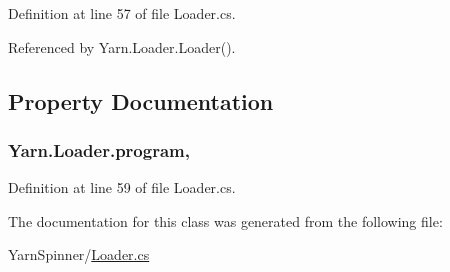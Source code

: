 Definition at line 57 of file Loader.\-cs.



Referenced by Yarn.\-Loader.\-Loader().



\subsection{Property Documentation}
\hypertarget{a00135_a6d8296076823c0c082df9024367f4860}{
\subsubsection[{program}]{ Yarn.\-Loader.\-program\hspace{0.3cm}{\ttfamily [get]}, {\ttfamily [set]}}}\label{a00135_a6d8296076823c0c082df9024367f4860}


Definition at line 59 of file Loader.\-cs.



The documentation for this class was generated from the following file\-:\begin{DoxyCompactItemize}
\item 
Yarn\-Spinner/\hyperlink{a00315}{Loader.\-cs}\end{DoxyCompactItemize}
